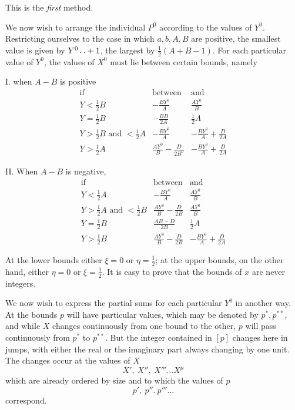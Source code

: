 This is the \emph{first} method.

We now wish to arrange the individual $P^0$ according to the values of $Y^0$. Restricting ourselves to the case in which $a,b,A,B$ are positive, the smallest value is given by $Y^0\mathinner{.\,.}+1$, the largest by $\frac12(A+B-1)$. For each particular value of $Y^0$, the values of $X^0$ must lie between certain bounds, namely

I. when $A-B$ is positive
\[
\begin{array}{c|c|c}
\text{if}&\text{between}&\text{and}\\
Y<\frac12B&-\frac{BY^0}{A}&\frac{AY^0}{B}\\[5pt]
Y=\frac12B&-\frac{BB}{2A}&\frac12A\\[5pt]
Y>\frac12B\text{ and }<\frac12A&-\frac{BY^0}{A}&-\frac{BY^0}{A}+\frac{D}{2A}\\[5pt]
Y>\frac12A&\frac{AY^0}{B}-\frac{D}{2B^0}&-\frac{BY^0}{A}+\frac{D}{2A}
\end{array}
\]

II. When $A-B$ is negative,
\[
\begin{array}{c|c|c}
\text{if}&\text{between}&\text{and}\\
Y<\frac12A&-\frac{BY^0}{A}&\frac{AY^0}{B}\\[5pt]
Y>\frac12A\text{ and }<\frac12B&\frac{AY^0}{B}-\frac{D}{2B}&\frac{AY^0}{B}\\[5pt]
Y=\frac12B&\frac{AB-D}{2B}&\frac12A\\[5pt]
Y>\frac12B&\frac{AY^0}{B}-\frac{D}{2B}&-\frac{BY^0}{A}+\frac{D}{2A}
\end{array}
\]

At the lower bounds either $\xi=0$ or $\eta=\frac12$; at the upper bounds, on the other hand, either $\eta=0$ or $\xi=\frac12$. It is easy to prove that the bounds of $x$ are never integers.

We now wish to express the partial sums for each particular $Y^0$ in another way. At the bounds $p$ will have particular values, which may be denoted by $p^*,p^{**}$, and while $X$ changes continuously from one bound to the other, $p$ will pass continuously from $p^*$ to $p^{**}$. But the integer contained in $[p]$ changes here in jumps, with either the real or the imaginary part always changing by one unit. The changes occur at the values of $X$
\[
X',\ X'',\ X'''\ldots X^\mu
\]
which are already ordered by size and to which the values of $p$
\[
p',\ p''.\ p'''\ldots
\]
correspond.

